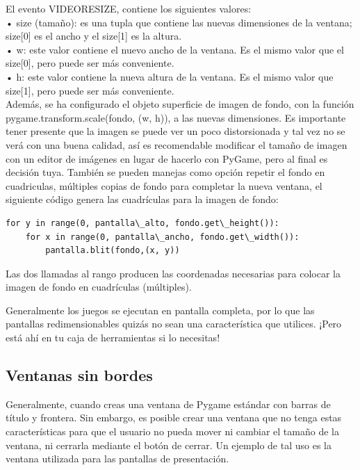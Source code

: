 El evento {\ttfamily VIDEORESIZE}, contiene los siguientes valores:\\

• {\ttfamily size} (tamaño): es una tupla que contiene las nuevas dimensiones de la ventana; {\ttfamily size[0]} es el ancho
y el {\ttfamily size[1]} es la altura.\\

• {\ttfamily w}: este valor contiene el nuevo ancho de la ventana. Es el mismo valor que el {\ttfamily size[0]}, pero
puede ser más conveniente.\\

• {\ttfamily h}: este valor contiene la nueva altura de la ventana. Es el mismo valor que {\ttfamily  size[1]}, pero
puede ser más conveniente.\\

Además, se ha configurado el objeto superficie de imagen de fondo, con la función  {\ttfamily pygame.transform.scale(fondo, (w, h))}, 
a las nuevas dimensiones.  Es importante tener presente que la imagen se puede ver un poco distorsionada y tal vez no se verá con una buena calidad, así es recomendable modificar el tamaño de imagen con un editor de imágenes en lugar de hacerlo con PyGame, pero al final es decisión tuya. También se pueden manejas como opción repetir el fondo en cuadriculas, múltiples copias de fondo para completar la nueva ventana, el siguiente código genera las cuadrículas  para la imagen de fondo: 
\begin{lstlisting}		
for y in range(0, pantalla\_alto, fondo.get\_height()):
    for x in range(0, pantalla\_ancho, fondo.get\_width()):      
        pantalla.blit(fondo,(x, y))
\end{lstlisting}         

Las dos llamadas al rango producen las coordenadas necesarias para colocar la imagen de fondo en cuadrículas (múltiples).


Generalmente los juegos se ejecutan en pantalla completa, por lo que las pantallas redimensionables quizás no
sean una característica que utilices. ¡Pero está ahí en tu caja de herramientas si lo necesitas!  


\subsection{Ventanas sin bordes}\label{sin_bordes}

Generalmente, cuando creas una ventana de Pygame estándar con barras de título y frontera. 
Sin embargo, es posible crear una ventana que no tenga estas características para que el usuario no pueda mover 
ni cambiar el tamaño de la ventana, ni cerrarla mediante el botón de cerrar. Un ejemplo de tal uso es la ventana
 utilizada para las pantallas de presentación. 

